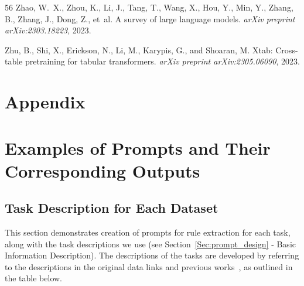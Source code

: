 \documentclass{article}
\theoremstyle{plain}
\theoremstyle{definition}
\theoremstyle{remark}
\begin{document}
\begin{thebibliography}{56}
Zhao, W.~X., Zhou, K., Li, J., Tang, T., Wang, X., Hou, Y., Min, Y., Zhang, B.,
  Zhang, J., Dong, Z., et~al.
\newblock A survey of large language models.
\newblock \emph{arXiv preprint arXiv:2303.18223}, 2023.

Zhu, B., Shi, X., Erickson, N., Li, M., Karypis, G., and Shoaran, M.
\newblock Xtab: Cross-table pretraining for tabular transformers.
\newblock \emph{arXiv preprint arXiv:2305.06090}, 2023.

\end{thebibliography}


\newpage

\appendix

\onecolumn


\section*{Appendix}
\section{Examples of Prompts and Their Corresponding Outputs}
\label{sec:examples}
\subsection{Task Description for Each Dataset}
\label{sec:task_desc}
This section demonstrates creation of prompts for rule extraction for each task, along with the task descriptions we use (see Section~\ref{Sec:prompt_design} - Basic Information Description). The descriptions of the tasks are developed by referring to the descriptions in the original data links and previous works~\cite{hegselmann2023tabllm}, as outlined in the table below.
\end{document}

